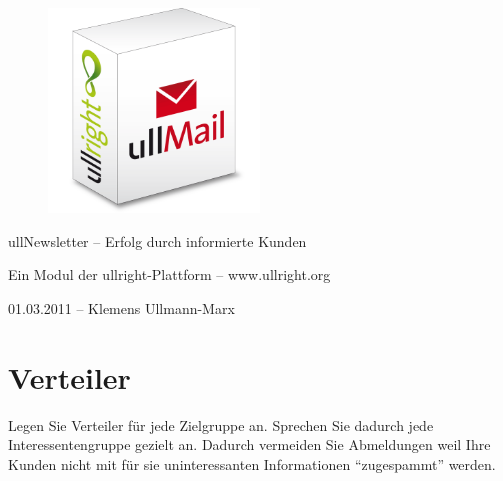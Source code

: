 \documentclass[article, a4paper, oneside, 11pt]{memoir}
\begin{document}
\vspace*{3cm}
\begin{figure}[htp]
\centering
\includegraphics[width=0.5\textwidth]{softwarebox}
\end{figure}

\vspace{3cm}

{%
\huge
\color{ullblue}
ullNewsletter -- Erfolg durch informierte Kunden
}

\vspace{0.2cm}

{%
\large
Ein Modul der ullright-Plattform -- www.ullright.org
}

\vspace{1cm}

{%
\footnotesize
01.03.2011 -- Klemens Ullmann-Marx
}

\clearpage

\pagestyle{plain}


\setcounter{secnumdepth}{2}
\setcounter{tocdepth}{2}
\tableofcontents*

\clearpage

\chapter{Verteiler}

Legen Sie Verteiler für jede Zielgruppe an. Sprechen Sie dadurch jede Interessentengruppe gezielt an. Dadurch vermeiden Sie Abmeldungen weil Ihre Kunden nicht mit für sie uninteressanten Informationen "`zugespammt"' werden.
\end{document}
